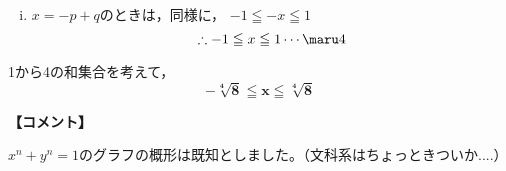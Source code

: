 \documentclass[b5j]{jarticle}
\begin{document}
\begin{multicols*}{2}
\begin{enumerate}[(i)]
\begin{multicols}{2}
$(p,\,q)=(1,\,0)$のとき，$x=-1$

$(p,\,q)=(0,\,1)$のとき，$x=1$
\end{multicols}
$$\therefore -1\leqq x\leqq1\cdots\maru3$$


\item $x=-p+q$のときは，同様に，
$ -1\leqq -x\leqq1$
$$ \therefore -1\leqq x\leqq1\cdots\maru4$$


\end{enumerate}

\maru1から\maru4の和集合を考えて，
$$\bm{-\sqrt[4]{8}\leqq x\leqq \sqrt[4]{8}}$$

{\bf 【コメント】}

$x^{n}+y^{n}=1$のグラフの概形は既知としました。（文科系はちょっときついか....）
\end{multicols*}

\newpage
\end{document}
